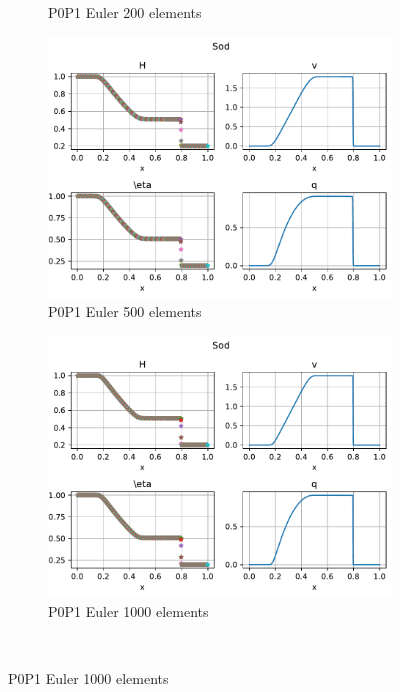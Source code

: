 \documentclass[english]{article}
\theoremstyle{thmstyleone}
\theoremstyle{thmstyletwo}
\theoremstyle{thmstylethree}
\begin{document}
\begin{figure}
{\begin{minipage}{\textwidth}
\begin{subfigure}{0.45\textwidth}
				\caption{P0P1 Euler 200 elements}
			\end{subfigure}
			\begin{subfigure}{0.45\textwidth}
				\includegraphics[trim= 0 180 0 0, clip,width=\textwidth]{figures/sod/P0P1_Euler_N_el00500.pdf}
				\caption{P0P1 Euler 500 elements}
			\end{subfigure}
			\begin{subfigure}{0.45\textwidth}
				\includegraphics[trim= 0 180 0 0, clip,width=\textwidth]{figures/sod/P0P1_Euler_N_el01000.pdf}
				\caption{P0P1 Euler 1000 elements}
			\end{subfigure}\\
			\vspace{2.em}

\end{minipage}}
\end{figure}
\end{document}
